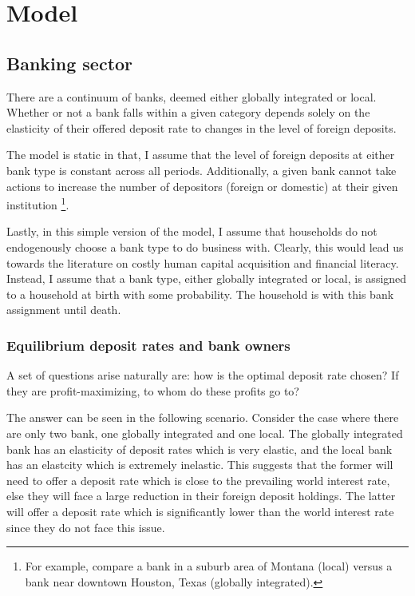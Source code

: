 \onlyinsubfile{\setcounter{section}{3}}
\section{Model}
\notinsubfile{\label{sec:Model}}

\subsection{Banking sector}

\par There are a continuum of banks, deemed either globally integrated or local. Whether or not a bank falls within a given category depends solely on the elasticity of their offered deposit rate to changes in the level of foreign deposits.

\par The model is static in that, I assume that the level of foreign deposits at either bank type is constant across all periods. Additionally, a given bank cannot take actions to increase the number of depositors (foreign or domestic) at their given institution \footnote{For example, compare a bank in a suburb area of Montana (local) versus a bank near downtown Houston, Texas (globally integrated).}.

\par Lastly, in this simple version of the model, I assume that households do not endogenously choose a bank type to do business with. Clearly, this would lead us towards the literature on costly human capital acquisition and financial literacy. Instead, I assume that a bank type, either globally integrated or local, is assigned to a household at birth with some probability. The household is  with this bank assignment until death.

\subsubsection{Equilibrium deposit rates and bank owners}

\par A set of questions arise naturally are: how is the optimal deposit rate chosen? If they are profit-maximizing, to whom do these profits go to?

\par The answer can be seen in the following scenario. Consider the case where there are only two bank, one globally integrated and one local. The globally integrated bank has an elasticity of deposit rates which is very elastic, and the local bank has an elastcity which is extremely inelastic. This suggests that the former will need to offer a deposit rate which is close to the prevailing world interest rate, else they will face a large reduction in their foreign deposit holdings. The latter will offer a deposit rate which is significantly lower than the world interest rate since they do not face this issue.

